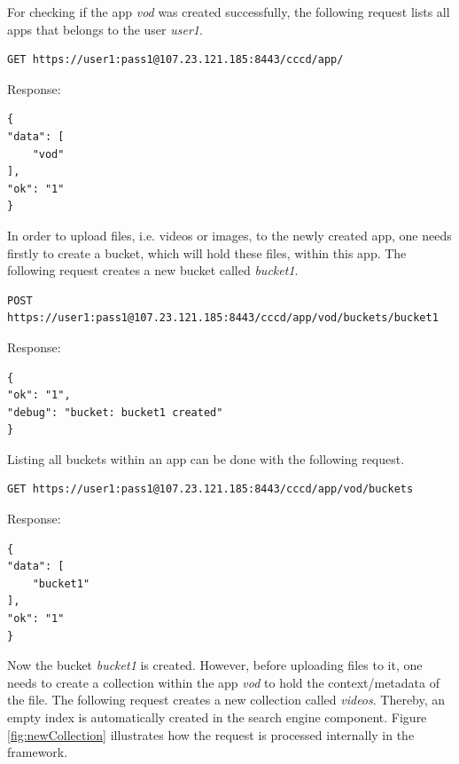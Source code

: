 For checking if the app \textit{vod} was created successfully, the following request lists all apps that belongs to the user \textit{user1}.

\begin{code}
\begin{verbatim}
GET https://user1:pass1@107.23.121.185:8443/cccd/app/
\end{verbatim}
Response:
\begin{verbatim}
{
"data": [
	"vod"
],
"ok": "1"
}
\end{verbatim}
\end{code}
 
In order to upload files, i.e. videos or images, to the newly created app, one needs firstly to create a bucket, which will hold these files, within this app. The following request creates a new bucket called \textit{bucket1}.

\begin{code}
\begin{verbatim}
POST https://user1:pass1@107.23.121.185:8443/cccd/app/vod/buckets/bucket1
\end{verbatim}
Response:
\begin{verbatim}
{
"ok": "1",
"debug": "bucket: bucket1 created"
}
\end{verbatim}
\end{code}

Listing all buckets within an app can be done with the following request.
\begin{code}
\begin{verbatim}
GET https://user1:pass1@107.23.121.185:8443/cccd/app/vod/buckets
\end{verbatim}
Response:
\begin{verbatim}
{
"data": [
	"bucket1"
],
"ok": "1"
}
\end{verbatim}
\end{code}

Now the bucket \textit{bucket1} is created. However, before uploading files to it, one needs to create a collection within the app \textit{vod} to hold the context/metadata of the file. The following request creates a new collection called \textit{videos}. Thereby, an empty index is automatically created in the search engine component. Figure \ref{fig:newCollection} illustrates how the request is processed internally in the framework.

